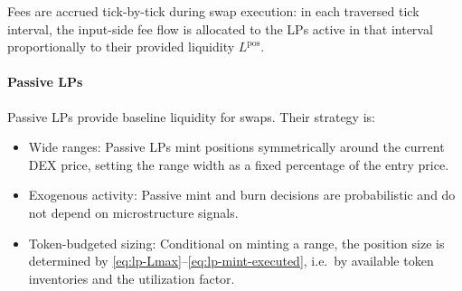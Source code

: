 \documentclass[11pt]{article}
\begin{document}
Fees are accrued tick-by-tick during swap execution: in each traversed tick
interval, the input-side fee flow is allocated to the LPs active in that interval proportionally to their
provided liquidity $L^{\mathrm{pos}}$.



\paragraph{Passive LPs}
Passive LPs provide baseline liquidity for swaps. Their strategy is:
\begin{itemize}[leftmargin=*]
  \item Wide ranges: Passive LPs mint positions symmetrically around the current DEX price, setting the range width as a fixed percentage of the entry price.
  \item Exogenous activity: Passive mint and burn decisions are probabilistic and do not depend on
  microstructure signals.
  \item Token-budgeted sizing: Conditional on minting a range, the position size is determined by
  \eqref{eq:lp-Lmax}--\eqref{eq:lp-mint-executed}, i.e.\ by available token inventories and the utilization
  factor.
\end{itemize}
\end{document}
